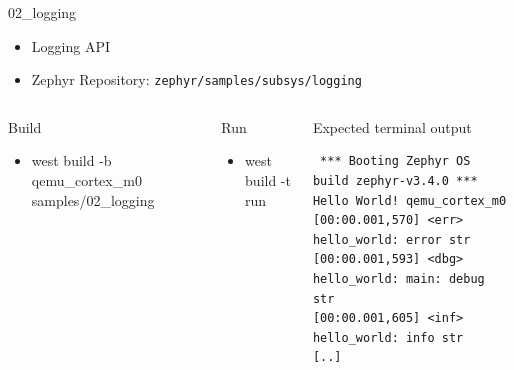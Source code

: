 \documentclass[10pt, aspectratio=169]{beamer}
\begin{document}
\begin{frame}[fragile]{02\_logging}

  \begin{itemize}
     \item Logging API
     \item Zephyr Repository: \texttt{zephyr/samples/subsys/logging}
  \end{itemize}

  \begin{columns}[T,onlytextwidth]
      \begin{block}{Build}
        \begin{itemize}
          \item {\scriptsize west build -b qemu\_cortex\_m0 samples/02\_logging}
        \end{itemize}
      \end{block}

     \begin{block}{Run}
        \begin{itemize}
          \item {\scriptsize west build -t run}
        \end{itemize}
      \end{block}



      \begin{exampleblock}{Expected terminal output}

        {\fontsize{6}{9.6}\selectfont
          \begin{verbatim}
 *** Booting Zephyr OS build zephyr-v3.4.0 ***
Hello World! qemu_cortex_m0
[00:00.001,570] <err> hello_world: error str
[00:00.001,593] <dbg> hello_world: main: debug str
[00:00.001,605] <inf> hello_world: info str
[..]
          \end{verbatim}
        }
      \end{exampleblock}
  \end{columns}
\end{frame}
\end{document}
